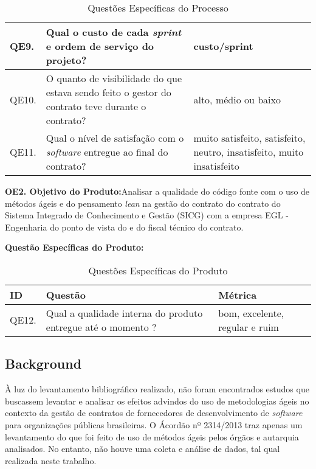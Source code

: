 \begin{table}[H]
\begin{tabular}{|p{0.8cm}|p{7.0cm}|p{6.0cm}|}
QE9.        & Qual o custo de cada \textit{sprint} e ordem de serviço do projeto?                                                                                       &  custo/sprint               \\ \hline
QE10.        & O quanto de visibilidade do que estava sendo feito o gestor do contrato teve durante o contrato?                                      &  alto, médio ou baixo              \\ \hline
QE11.        & Qual o nível de satisfação com o \textit{software} entregue ao final do contrato?                         &   muito satisfeito, satisfeito, neutro, insatisfeito, muito insatisfeito             \\ \hline
\end{tabular}
\caption{Questões Específicas do Processo}
		\label{qespec}
\end{table}


\textbf{OE2. Objetivo do Produto:}Analisar a qualidade do código fonte com o uso de métodos ágeis e do pensamento \textit{lean} na gestão do contrato do contrato do Sistema Integrado 
de Conhecimento e Gestão (SICG) com a empresa EGL - Engenharia do ponto de vista do  e do fiscal técnico do contrato.

\textbf{Questão Específicas do Produto:}

\begin{table}[H]
\footnotesize
\center
\begin{tabular}{|p{0.8cm}|p{8.0cm}|p{5.0cm}|}
\hline
\textbf{ID} & \textbf{Questão}                                                                                                                                  & \textbf{Métrica}    \\ \hline
QE12.        &  Qual a qualidade interna do produto entregue até o momento ?                                                                            &  bom, excelente, regular e ruim       \\ \hline
\end{tabular}
\caption{Questões Específicas do Produto}
		\label{qespecprod}
\end{table}



\subsection[Background]{Background}

À luz do levantamento bibliográfico realizado, não foram encontrados estudos que buscassem levantar e analisar os efeitos advindos do uso de metodologias ágeis no contexto da gestão de contratos de fornecedores de desenvolvimento de \textit{software} para organizações públicas brasileiras. O Ácordão nº 2314/2013 traz apenas um levantamento do que foi feito de uso de métodos ágeis pelos órgãos e autarquia analisados. No entanto, não houve uma coleta e análise de dados, tal qual realizada neste trabalho.

